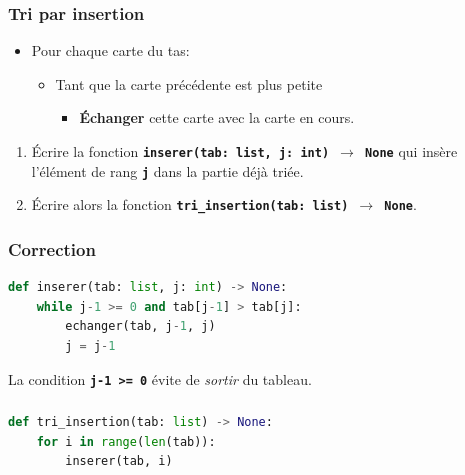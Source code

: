 \documentclass[svgnames,11pt]{beamer}
\begin{document}
\begin{frame}
    \frametitle{Tri par insertion}
    \begin{itemize}
        \item Pour chaque carte du tas:
              \begin{itemize}
                  \item Tant que la carte précédente est plus petite
                  \begin{itemize}
                    \item \textbf{Échanger} cette carte avec la carte en cours.
                  \end{itemize}
              \end{itemize}

    \end{itemize}
    \begin{activite}
        \begin{enumerate}
            \item Écrire la fonction \textbf{\texttt{inserer(tab: list, j: int) $\rightarrow$ None}} qui insère l'élément de rang \textbf{\texttt{j}} dans la partie déjà triée.
            \item Écrire alors la fonction \textbf{\texttt{tri\_insertion(tab: list) $\rightarrow$ None}}.
        \end{enumerate}
    \end{activite}

\end{frame}
\begin{frame}[fragile]
    \frametitle{Correction}

\begin{center}
\begin{lstlisting}[language=Python , basicstyle=\ttfamily\small, xleftmargin=2em, xrightmargin=0em]
def inserer(tab: list, j: int) -> None:
    while j-1 >= 0 and tab[j-1] > tab[j]:
        echanger(tab, j-1, j)
        j = j-1
\end{lstlisting}
\end{center}
\begin{aretenir}[Remarque]
La condition \textbf{\texttt{j-1 >= 0}} évite de \emph{sortir} du tableau.
\end{aretenir}
\end{frame}
\begin{frame}[fragile]
    \frametitle{}

\begin{center}
\begin{lstlisting}[language=Python , basicstyle=\ttfamily\small, xleftmargin=2em, xrightmargin=0em]
def tri_insertion(tab: list) -> None:
    for i in range(len(tab)):
        inserer(tab, i)
\end{lstlisting}
\end{center}

\end{frame}
\end{document}
